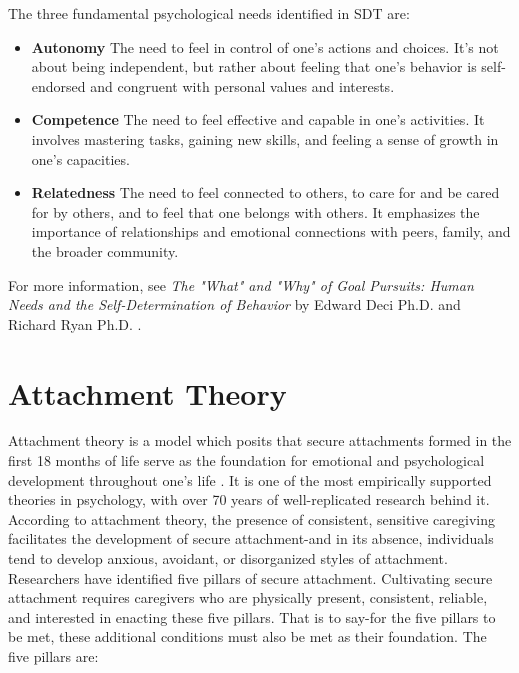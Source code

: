 \documentclass[12pt,letterpaper]{book}
\begin{document}
The three fundamental psychological needs identified in SDT are:
\begin{itemize}
    \item \textbf{Autonomy} The need to feel in control of one's actions and choices. It's not about being independent, but rather about feeling that one's behavior is self-endorsed and congruent with personal values and interests.
    \item \textbf{Competence} The need to feel effective and capable in one's activities. It involves mastering tasks, gaining new skills, and feeling a sense of growth in one's capacities.
    \item \textbf{Relatedness} The need to feel connected to others, to care for and be cared for by others, and to feel that one belongs with others. It emphasizes the importance of relationships and emotional connections with peers, family, and the broader community.
\end{itemize}
For more information, see \textit{The "What" and "Why" of Goal Pursuits: Human Needs and the Self-Determination of Behavior} by Edward Deci Ph.D. and Richard Ryan Ph.D. \cite{deciSDT}.
\section{Attachment Theory}
\label{attachment}
Attachment theory is a model which posits that secure attachments formed in the first 18 months of life serve as the foundation for emotional and psychological development throughout one's life \cite{brownAttachmentDisturbances}. It is one of the most empirically supported theories in psychology, with over 70 years of well-replicated research behind it. According to attachment theory, the presence of consistent, sensitive caregiving facilitates the development of secure attachment-and in its absence, individuals tend to develop anxious, avoidant, or disorganized styles of attachment. Researchers have identified five pillars of secure attachment. Cultivating secure attachment requires caregivers who are physically present, consistent, reliable, and interested in enacting these five pillars. That is to say-for the five pillars to be met, these additional conditions must also be met as their foundation. The five pillars are:
\end{document}
